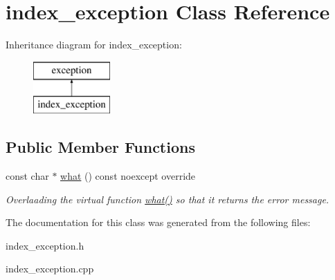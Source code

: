 \hypertarget{classindex__exception}{}\section{index\+\_\+exception Class Reference}
\label{classindex__exception}
Inheritance diagram for index\+\_\+exception\+:\begin{figure}[H]
\begin{center}
\leavevmode
\includegraphics[height=2.000000cm]{classindex__exception}
\end{center}
\end{figure}
\subsection*{Public Member Functions}
\begin{DoxyCompactItemize}
\item 
\mbox{\label{classindex__exception_ab802455f8559c660215559eb1fe75274}} 
const char $\ast$ \hyperlink{classindex__exception_ab802455f8559c660215559eb1fe75274}{what} () const noexcept override
\begin{DoxyCompactList}\small\item\em Overlaading the virtual function \hyperlink{classindex__exception_ab802455f8559c660215559eb1fe75274}{what()} so that it returns the error message. \end{DoxyCompactList}\end{DoxyCompactItemize}


The documentation for this class was generated from the following files\+:\begin{DoxyCompactItemize}
\item 
index\+\_\+exception.\+h\item 
index\+\_\+exception.\+cpp\end{DoxyCompactItemize}
